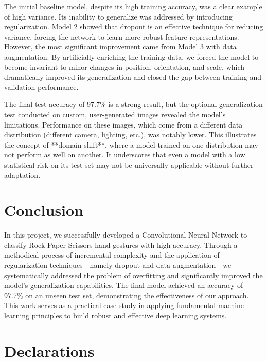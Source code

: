 \documentclass[pdflatex,sn-mathphys-num]{sn-jnl}%
\theoremstyle{thmstyleone}%
\theoremstyle{thmstyletwo}%
\theoremstyle{thmstylethree}%
\begin{document}
The initial baseline model, despite its high training accuracy, was a clear example of high variance. Its inability to generalize was addressed by introducing regularization. Model 2 showed that dropout is an effective technique for reducing variance, forcing the network to learn more robust feature representations. However, the most significant improvement came from Model 3 with data augmentation. By artificially enriching the training data, we forced the model to become invariant to minor changes in position, orientation, and scale, which dramatically improved its generalization and closed the gap between training and validation performance.

The final test accuracy of 97.7\% is a strong result, but the optional generalization test conducted on custom, user-generated images revealed the model's limitations. Performance on these images, which come from a different data distribution (different camera, lighting, etc.), was notably lower. This illustrates the concept of **domain shift**, where a model trained on one distribution may not perform as well on another. It underscores that even a model with a low statistical risk on its test set may not be universally applicable without further adaptation.

\section{Conclusion}\label{sec13}

In this project, we successfully developed a Convolutional Neural Network to classify Rock-Paper-Scissors hand gestures with high accuracy. Through a methodical process of incremental complexity and the application of regularization techniques—namely dropout and data augmentation—we systematically addressed the problem of overfitting and significantly improved the model's generalization capabilities. The final model achieved an accuracy of 97.7\% on an unseen test set, demonstrating the effectiveness of our approach. This work serves as a practical case study in applying fundamental machine learning principles to build robust and effective deep learning systems.

\backmatter

\section*{Declarations}
\end{document}
